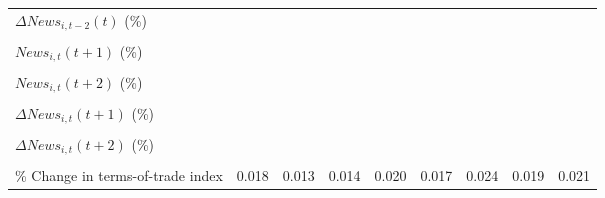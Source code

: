 {\begin{tabular}{l*{8}{c}}
\addlinespace
$ \Delta News_{i,t-2}(t)$ (\%)&                     &                     &                     &                     &                     &                     &                     &                     \\
                    &                     &                     &                     &                     &                     &                     &                     &                     \\
\addlinespace
$ News_{i,t}(t+1)$ (\%)&                     &                     &                     &                     &                     &                     &                     &                     \\
                    &                     &                     &                     &                     &                     &                     &                     &                     \\
\addlinespace
$ News_{i,t}(t+2)$ (\%)&                     &                     &                     &                     &                     &                     &                     &                     \\
                    &                     &                     &                     &                     &                     &                     &                     &                     \\
\addlinespace
$ \Delta News_{i,t}(t+1)$ (\%)&                     &                     &                     &                     &                     &                     &                     &                     \\
                    &                     &                     &                     &                     &                     &                     &                     &                     \\
\addlinespace
$ \Delta News_{i,t}(t+2)$ (\%)&                     &                     &                     &                     &                     &                     &                     &                     \\
                    &                     &                     &                     &                     &                     &                     &                     &                     \\
\addlinespace
\% Change in terms-of-trade index&       0.018         &       0.013         &       0.014         &       0.020         &       0.017         &       0.024         &       0.019         &       0.021         \\

\end{tabular}}
